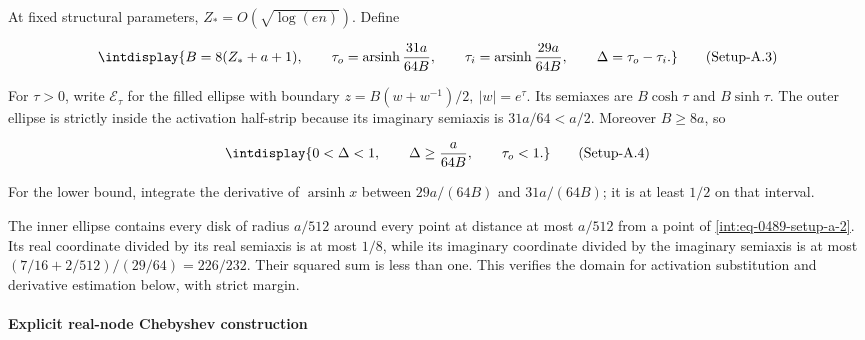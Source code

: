 
At fixed structural parameters, \(Z_*=O(\sqrt{\log(en)})\). Define


\label{int:eq-setup-a-3}
\begingroup\renewcommand{\theHequation}{intdisplay.963}
\begin{equation}
\intdisplay{
B=8(Z_*+a+1),\qquad
\tau_o=\operatorname{arsinh}\frac{31a}{64B},\qquad
\tau_i=\operatorname{arsinh}\frac{29a}{64B},\qquad
\Delta=\tau_o-\tau_i.
}
\tag{Setup-A.3}
\label{int:eq-0490-setup-a-3}
\end{equation}
\endgroup


For \(\tau>0\), write \(\mathcal E_\tau\) for the filled ellipse with boundary \(z=B(w+w^{-1})/2,\allowbreak \ |w|=e^\tau\). Its semiaxes are \(B\cosh\tau\) and \(B\sinh\tau\). The outer ellipse is strictly inside the activation half-strip because its imaginary semiaxis is \(31a/64<a/2\). Moreover \(B\ge8a\), so


\label{int:eq-setup-a-4}
\begingroup\renewcommand{\theHequation}{intdisplay.964}
\begin{equation}
\intdisplay{
0<\Delta<1,\qquad \Delta\ge\frac{a}{64B},\qquad \tau_o<1.
}
\tag{Setup-A.4}
\label{int:eq-0491-setup-a-4}
\end{equation}
\endgroup


For the lower bound, integrate the derivative of \(\operatorname{arsinh}x\) between \(29a/(64B)\) and \(31a/(64B)\); it is at least \(1/2\) on that interval.



The inner ellipse contains every disk of radius \(a/512\) around every point at distance at most \(a/512\) from a point of \hyperref[int:eq-setup-a-2]{\eqref{int:eq-0489-setup-a-2}}. Its real coordinate divided by its real semiaxis is at most \(1/8\), while its imaginary coordinate divided by the imaginary semiaxis is at most \((7/16+2/512)/(29/64)=226/232\). Their squared sum is less than one. This verifies the domain for activation substitution and derivative estimation below, with strict margin.


\paragraph{Explicit real-node Chebyshev construction}
\label{int:setup-activation-2}
\mbox{}\par\smallskip

